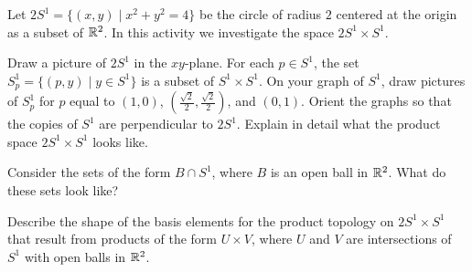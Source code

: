 \begin{activity} Let $2S^1 = \{(x,y) \mid x^2 + y^2 = 4\}$ be the circle of radius $2$ centered at the origin as a subset of $\mathbb{R}^2$. In this activity we investigate the space $2S^1 \times  S^1$.  
\ba
\item Draw a picture of $2S^1$ in the $xy$-plane. For each $p \in S^1$, the set $S^1_p = \{(p, y) \mid y \in S^1\}$ is a subset of $S^1 \times S^1$. On your graph of $S^1$, draw pictures of $S^1_p$ for $p$ equal to $(1,0)$, $\left(\frac{\sqrt{2}}{2}, \frac{\sqrt{2}}{2}\right)$, and $(0,1)$. Orient the graphs so that the copies of $S^1$ are perpendicular to $2S^1$. Explain in detail what the product space $2S^1 \times S^1$ looks like. 

\item Consider the sets of the form $B \cap S^1$, where $B$ is an open ball in $\mathbb{R}^2$. What do these sets look like?

\item Describe the shape of the basis elements for the product topology on $2S^1 \times S^1$ that result from products of the form $U \times V$, where $U$ and $V$ are intersections of $S^1$ with open balls in $\mathbb{R}^2$. 

\ea

\end{activity}

